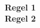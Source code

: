 \frenchspacing


\begin{center}
  \\[3cm]
  { \huge \bfseries Regel 1 \\ Regel 2 \\[12cm] } 
\end{center}

\pagebreak
